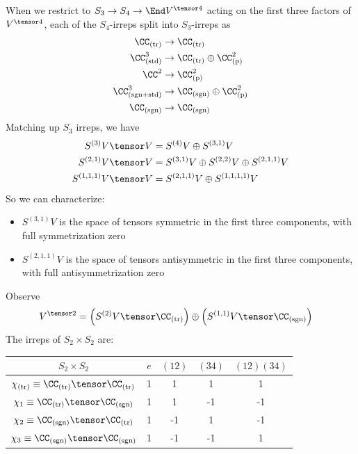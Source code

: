 \documentclass[11pt, headheight=30pt]{scrartcl}
\begin{document}
When we restrict to $S_3\to S_4\to \End V^{\tensor 4}$ acting on the first three factors of $V^{\tensor 4}$, each of the $S_4$-irreps split into $S_3$-irreps as
\begin{align*}
    \CC_{\text{(tr)}} &\to \CC_{\text{(tr)}} \\
    \CC^3_{\text{(std)}} &\to \CC_{\text{(tr)}} \oplus \CC^2_{\text{(p)}} \\
    \CC^2_{} &\to \CC^2_{\text{(p)}} \\
    \CC^3_{\text{(sgn+std)}} &\to \CC_{\text{(sgn)}} \oplus \CC^2_{\text{(p)}} \\
    \CC_{\text{(sgn)}} &\to \CC_{\text{(sgn)}}
\end{align*}
Matching up $S_3$ irreps, we have
\begin{align*}
    S^{(3)}V \tensor V &= S^{(4)}V \oplus S^{(3,1)}V \\
    S^{(2,1)}V \tensor V &= S^{(3,1)}V \oplus S^{(2,2)}V \oplus S^{(2,1,1)}V \\
    S^{(1,1,1)}V \tensor V &= S^{(2,1,1)}V \oplus S^{(1,1,1,1)}V
\end{align*}
So we can characterize:
\begin{itemize}
    \item $S^{(3,1)}V$ is the space of tensors symmetric in the first three components, with full symmetrization zero
    \item $S^{(2,1,1)}V$ is the space of tensors antisymmetric in the first three components, with full antisymmetrization zero
\end{itemize}

Observe
\begin{align*}
    V^{\tensor 2} &= \left(S^{(2)}V \tensor \CC_{\text{(tr)}}\right) \oplus \left(S^{(1,1)}V \tensor \CC_{\text{(sgn)}}\right)
\end{align*}
The irreps of $S_2 \times S_2$ are:
\begin{center}
\begin{tabular}{c|cccc}
    $S_2 \times S_2$ & $e$ & $(12)$ & $(34)$ & $(12)(34)$ \\
    \hline
    $\chi_{\text{(tr)}} \equiv \CC_{\text{(tr)}} \tensor \CC_{\text{(tr)}}$ & 1 & 1 & 1 & 1 \\
    $\chi_1 \equiv \CC_{\text{(tr)}} \tensor \CC_{\text{(sgn)}}$ & 1 & 1 & -1 & -1\\
    $\chi_2 \equiv \CC_{\text{(sgn)}} \tensor \CC_{\text{(tr)}}$ & 1 & -1 & 1 & -1\\
    $\chi_3 \equiv \CC_{\text{(sgn)}} \tensor \CC_{\text{(sgn)}}$ & 1 & -1 & -1 & 1
\end{tabular}
\end{center}
\end{document}
